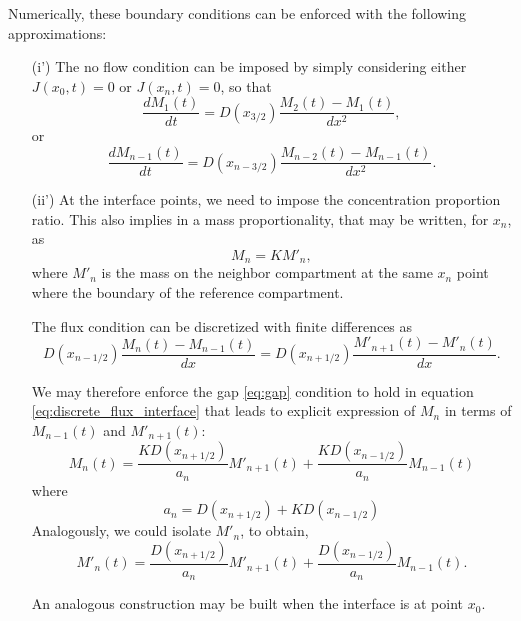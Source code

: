 \documentclass[final,1p,times]{elsarticle}
\begin{document}
Numerically, these boundary conditions can be enforced with the following approximations:
\begin{enumerate}
\item[(i')] The no flow condition can be imposed by simply considering either $J(x_0,t)=0$ or $J(x_n,t)=0$, so that
\begin{equation}
\frac{d M_{1}(t)}{dt}= D(x_{3/2})\frac{M_{2}(t)-M_{1}(t) }{dx^2},
\end{equation}
or
\begin{equation}
\frac{d M_{n-1}(t)}{dt}= D(x_{n-3/2})\frac{M_{n-2}(t)-M_{n-1}(t) }{dx^2}.
\end{equation}

\item[(ii')] 
At the interface points, we need to impose the concentration proportion ratio. This also implies in a mass proportionality, that may be written, for $x_n$, as
\begin{equation}
M_{n}=K M'_{n},
\label{eq:gap}
\end{equation}
where $M'_{n}$ is the mass on the neighbor compartment at the same $x_n$ point where the boundary of the reference compartment.

The flux condition can be discretized with finite differences as
\begin{equation}
 D(x_{n-1/2})\frac{M_{n}(t)-M_{n-1}(t) }{dx}= D(x_{n+1/2})\frac{M'_{n+1}(t)-M'_{n}(t) }{dx}.
 \label{eq:discrete_flux_interface}
\end{equation}

We may therefore enforce the gap \eqref{eq:gap} condition to hold in equation \eqref{eq:discrete_flux_interface} that leads to explicit expression of $M_{n}$ in terms of $M_{n-1}(t)$ and $M'_{n+1}(t)$:
\begin{equation}
M_{n}(t) = \frac{ KD(x_{n+1/2})}{a_n} M'_{n+1}(t)+\frac{ KD(x_{n-1/2})}{a_n} M_{n-1}(t)
\label{eq:gap+discrete_flux_interface}
\end{equation}
where 
\begin{equation}
a_{n}=D(x_{n+1/2})+KD(x_{n-1/2})
\end{equation}
Analogously, we could isolate $M'_n$, to obtain, 
\begin{equation}
M'_{n}(t) = \frac{ D(x_{n+1/2})}{a_n} M'_{n+1}(t)+\frac{ D(x_{n-1/2})}{a_n} M_{n-1}(t).
\end{equation}


An analogous construction may be built when the interface is at point $x_0$.
\end{enumerate}
\end{document}
